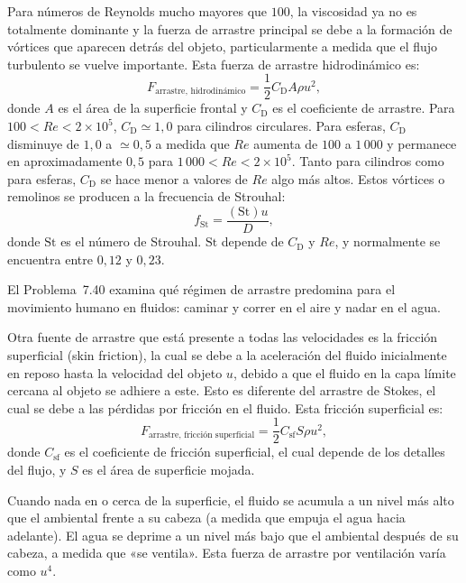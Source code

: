 \documentclass[12pt]{book}
\begin{document}
Para números de Reynolds mucho mayores que $100$, la viscosidad ya no es totalmente dominante y la fuerza de arrastre principal se debe a la formación de vórtices que aparecen detrás del objeto, particularmente a medida que el flujo turbulento se vuelve importante. Esta fuerza de arrastre hidrodinámico es:
\begin{equation}
F_{\text{arrastre, hidrodinámico}} = \frac{1}{2} C_{\text{D}} A \rho u^2,
\label{eq:759}
\end{equation}
donde $A$ es el área de la superficie frontal y $C_{\text{D}}$ es el coeficiente de arrastre. Para $100 < Re < 2 \times 10^5$, $C_{\text{D}} \simeq 1{,}0$ para cilindros circulares. Para esferas, $C_{\text{D}}$ disminuye de $1{,}0$ a $\simeq 0{,}5$ a medida que $Re$ aumenta de $100$ a $1\,000$ y permanece en aproximadamente $0{,}5$ para $1\,000 < Re < 2 \times 10^5$. Tanto para cilindros como para esferas, $C_{\text{D}}$ se hace menor a valores de $Re$ algo más altos. Estos vórtices o remolinos se producen a la frecuencia de Strouhal:
\begin{equation}
f_{\text{St}} = \frac{(\text{St})u}{D},
\label{eq:760}
\end{equation}
donde $\text{St}$ es el número de Strouhal. $\text{St}$ depende de $C_{\text{D}}$ y $Re$, y normalmente se encuentra entre $0{,}12$ y $0{,}23$.

El Problema~7.40 examina qué régimen de arrastre predomina para el movimiento humano en fluidos: caminar y correr en el aire y nadar en el agua.

Otra fuente de arrastre que está presente a todas las velocidades es la fricción superficial (skin friction), la cual se debe a la aceleración del fluido inicialmente en reposo hasta la velocidad del objeto $u$, debido a que el fluido en la capa límite cercana al objeto se adhiere a este. Esto es diferente del arrastre de Stokes, el cual se debe a las pérdidas por fricción en el fluido. Esta fricción superficial es:
\begin{equation}
F_{\text{arrastre, fricción superficial}} = \frac{1}{2} C_{\text{sf}} S \rho u^2,
\label{eq:761}
\end{equation}
donde $C_{\text{sf}}$ es el coeficiente de fricción superficial, el cual depende de los detalles del flujo, y $S$ es el área de superficie mojada.

Cuando nada en o cerca de la superficie, el fluido se acumula a un nivel más alto que el ambiental frente a su cabeza (a medida que empuja el agua hacia adelante). El agua se deprime a un nivel más bajo que el ambiental después de su cabeza, a medida que «se ventila». Esta fuerza de arrastre por ventilación varía como $u^4$.
\end{document}

